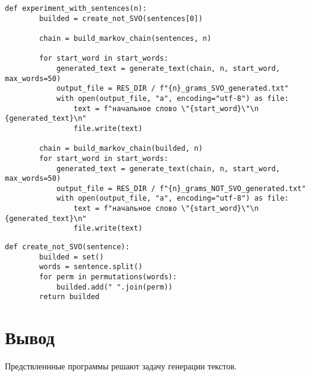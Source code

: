 \begin{lstlisting}[caption={Исследование с предложениями из задания}]
    def experiment_with_sentences(n):
        builded = create_not_SVO(sentences[0])

        chain = build_markov_chain(sentences, n)

        for start_word in start_words:
            generated_text = generate_text(chain, n, start_word, max_words=50)
            output_file = RES_DIR / f"{n}_grams_SVO_generated.txt"
            with open(output_file, "a", encoding="utf-8") as file:
                text = f"начальное слово \"{start_word}\"\n {generated_text}\n"
                file.write(text)

        chain = build_markov_chain(builded, n)
        for start_word in start_words:
            generated_text = generate_text(chain, n, start_word, max_words=50)
            output_file = RES_DIR / f"{n}_grams_NOT_SVO_generated.txt"
            with open(output_file, "a", encoding="utf-8") as file:
                text = f"начальное слово \"{start_word}\"\n {generated_text}\n"
                file.write(text)
\end{lstlisting}

\begin{lstlisting}[caption={Создание вариаций предложений из слов}]
    def create_not_SVO(sentence):
        builded = set()
        words = sentence.split()
        for perm in permutations(words):
            builded.add(" ".join(perm))
        return builded
\end{lstlisting}

\section*{Вывод}

Предствленнные программы решают задачу генерации текстов.

\clearpage
